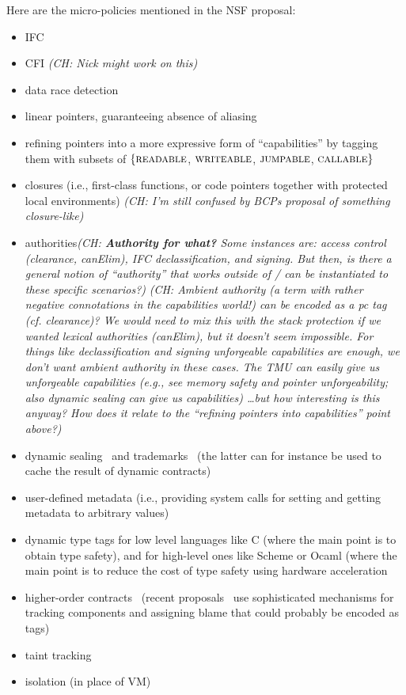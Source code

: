 \documentclass{article}
\newcommand{\ch}[1]{{\color{dkblue}\em (CH: #1)}}
\newcommand*{\EG}{e.g.,\xspace}
\newcommand*{\IE}{i.e.,\xspace}
\newcommand{\micro}{micro-}
\newcommand{\uPs}{\micro policies\xspace}
\begin{document}
Here are the \uPs mentioned in the NSF proposal:
\begin{itemize}
  \item IFC
  \item CFI \ch{Nick might work on this}
  \item data race detection
  \item linear pointers, guaranteeing absence of aliasing
  \item refining pointers into a more expressive form of
    ``capabilities'' by tagging them with subsets of
    $\{\mbox{\sc readable}$, $\mbox{\sc writeable}$, $\mbox{\sc jumpable}$,
    $\mbox{\sc callable}\}$
  \item closures (\IE first-class functions, or code pointers together
  with protected local environments)
  \ch{I'm still confused by BCPs proposal of something closure-like}
  \item authorities\ch{{\bf Authority for what?} Some instances are: 
      access control (clearance, canElim), IFC declassification, and
      signing. But then, is there a general notion of ``authority'' that
      works outside of / can be instantiated to these specific scenarios?}
%
    \ch{Ambient authority (a term with rather negative connotations in
      the capabilities world!) can be encoded as a pc tag
      (cf. clearance)? We would need to mix this with the stack
      protection if we wanted lexical authorities (canElim), but it
      doesn't seem impossible. For things like declassification and
      signing unforgeable capabilities are enough, we don't want
      ambient authority in these cases. The TMU can easily give us
      unforgeable capabilities (\EG see memory safety and pointer
      unforgeability; also dynamic sealing can give us capabilities)
      \ldots but how interesting is this anyway? How does it relate
      to the ``refining pointers into capabilities'' point above?}
  \item dynamic sealing~\cite{Morris::73,SumiiPierce01,SumiiPierce2004}
        and trademarks~\cite{Morris::73} (the latter
    can for instance be used to cache the result of dynamic
    contracts)
  \item user-defined metadata (\IE providing system calls for
    setting and getting metadata to arbitrary values)
  \item dynamic type tags for low level languages like C (where the
    main point is to obtain type safety), and for high-level ones like
    Scheme or Ocaml (where the main point is to reduce the cost of
    type safety using hardware acceleration
  \item higher-order contracts~\cite{FindlerF02}
    (recent proposals~\cite{DimoulasFFF11} use sophisticated mechanisms
     for tracking components and assigning blame that could probably
     be encoded as tags)
  \item taint tracking
  \item isolation (in place of VM)
\end{itemize}
\end{document}
